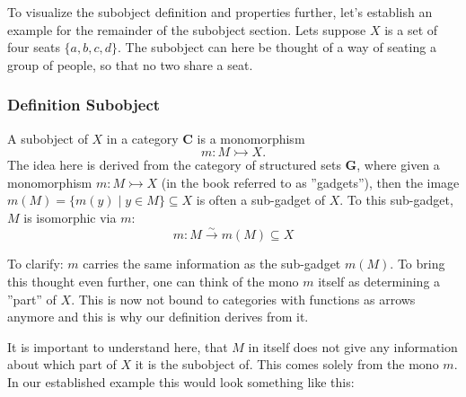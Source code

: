 \documentclass[11pt]{article}
\begin{document}
To visualize the subobject definition and properties further, let's establish
an example for the remainder of the subobject section. Lets suppose $X$ is a
set of four seats $\{a, b, c, d\}$. The subobject can here be thought of a way
of seating a group of people, so that no two share a seat.

\subsubsection{Definition Subobject}

A subobject of $X$ in a category $\mathbf{C}$ is a monomorphism 
$$
m: M \rightarrowtail X.
$$
The idea here is derived from the category of structured sets \textbf{G}, where
given a monomorphism $m: M \rightarrowtail X$ (in the book referred to as
''gadgets''), then the image $m(M) = \{m(y) \mid y \in M\} \subseteq X$ is often a
sub-gadget of $X$. To this sub-gadget, $M$ is isomorphic via $m$:
$$
m: M \overset{\sim}{\rightarrow} m(M) \subseteq X
$$

To clarify: $m$ carries the same information as the sub-gadget $m(M)$. To bring
this thought even further, one can think of the mono $m$ itself as determining
a ''part'' of $X$. This is now not bound to categories with functions as arrows
anymore and this is why our definition derives from it.

It is important to understand here, that $M$ in itself does not give any
information about which part of $X$ it is the subobject of. This comes solely
from the mono $m$. In our established example this would look something like
this:

\begin{center}
\end{center}
\end{document}
